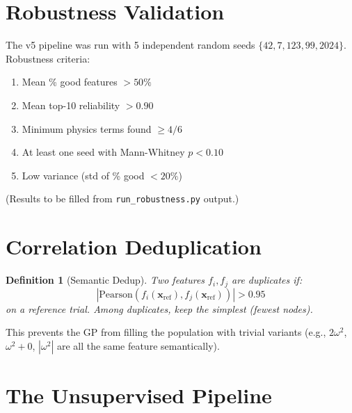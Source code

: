 \documentclass[11pt,a4paper]{article}
\newtheorem{definition}{Definition}
\begin{document}
\section{Robustness Validation}

The v5 pipeline was run with 5 independent random seeds
$\{42, 7, 123, 99, 2024\}$. Robustness criteria:

\begin{enumerate}
    \item Mean \% good features $> 50\%$
    \item Mean top-10 reliability $> 0.90$
    \item Minimum physics terms found $\geq 4/6$
    \item At least one seed with Mann-Whitney $p < 0.10$
    \item Low variance (std of \% good $< 20\%$)
\end{enumerate}

(Results to be filled from \texttt{run\_robustness.py} output.)

\section{Correlation Deduplication}

\begin{definition}[Semantic Dedup]
Two features $f_i, f_j$ are duplicates if:
\[
|\text{Pearson}(f_i(\mathbf{x}_{\text{ref}}), f_j(\mathbf{x}_{\text{ref}}))|
> 0.95
\]
on a reference trial. Among duplicates, keep the simplest (fewest nodes).
\end{definition}

This prevents the GP from filling the population with trivial variants
(e.g., $2\omega^2$, $\omega^2 + 0$, $|\omega^2|$ are all the same feature
semantically).

\section{The Unsupervised Pipeline}
\end{document}
